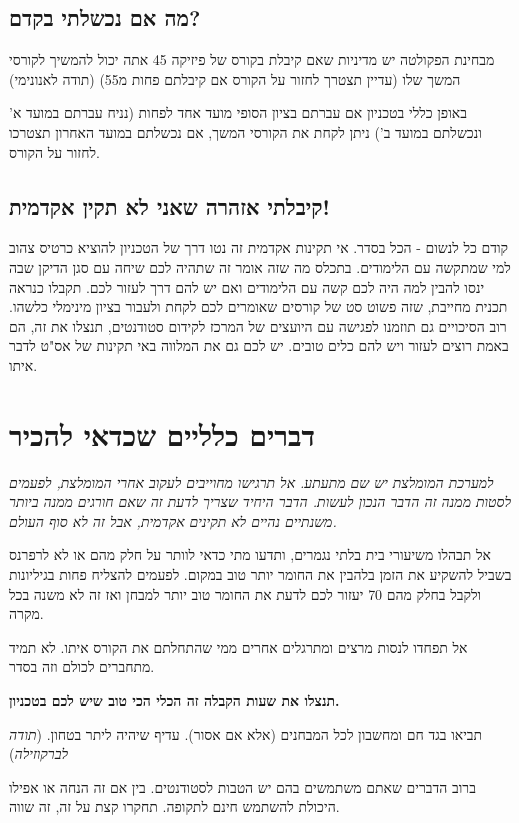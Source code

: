\documentclass[a4paper,12pt]{article}
\begin{document}
\subsection{מה אם נכשלתי בקדם?}

מבחינת הפקולטה יש מדיניות שאם קיבלת בקורס של פיזיקה 45 אתה יכול להמשיך לקורסי המשך שלו (עדיין תצטרך לחזור על הקורס אם קיבלתם פחות מ55) (תודה לאנונימי)

באופן כללי בטכניון אם עברתם בציון הסופי מועד אחד לפחות (נניח עברתם במועד א' ונכשלתם במועד ב') ניתן לקחת את הקורסי המשך, אם נכשלתם במועד האחרון תצטרכו לחזור על הקורס. 

\subsection{קיבלתי אזהרה שאני לא תקין אקדמית!}

קודם כל לנשום - הכל בסדר. אי תקינות אקדמית זה נטו דרך של הטכניון להוציא כרטיס צהוב למי שמתקשה עם הלימודים. בתכלס מה שזה אומר זה שתהיה לכם שיחה עם סגן הדיקן שבה ינסו להבין למה היה לכם קשה עם הלימודים ואם יש להם דרך לעזור לכם. תקבלו כנראה תכנית מחייבת, שזה פשוט סט של קורסים שאומרים לכם לקחת ולעבור בציון מינימלי כלשהו. רוב הסיכויים גם תוזמנו לפגישה עם היועצים של המרכז לקידום סטודנטים, תנצלו את זה, הם באמת רוצים לעזור ויש להם כלים טובים. יש לכם גם את המלווה באי תקינות של אס"ט לדבר איתו.

\section{דברים כלליים שכדאי להכיר}

\emph{למערכת המומלצת יש שם מתעתע. אל תרגישו מחוייבים לעקוב אחרי המומלצת, לפעמים לסטות ממנה זה הדבר הנכון לעשות. הדבר היחיד שצריך לדעת זה שאם חורגים ממנה ביותר משנתיים נהיים לא תקינים אקדמית, אבל זה לא סוף העולם.}

אל תבהלו משיעורי בית בלתי נגמרים, ותדעו מתי כדאי לוותר על חלק מהם או לא לרפרנס בשביל להשקיע את הזמן בלהבין את החומר יותר טוב במקום. לפעמים להצליח פחות בגיליונות ולקבל בחלק מהם 70 יעזור לכם לדעת את החומר טוב יותר למבחן ואז זה לא משנה בכל מקרה.

אל תפחדו לנסות מרצים ומתרגלים אחרים ממי שהתחלתם את הקורס איתו. לא תמיד מתחברים לכולם וזה בסדר.

\textbf{תנצלו את שעות הקבלה זה הכלי הכי טוב שיש לכם בטכניון.}

תביאו בגד חם ומחשבון לכל המבחנים (אלא אם אסור). עדיף שיהיה ליתר בטחון. (\emph{תודה לברקוזילה})

ברוב הדברים שאתם משתמשים בהם יש הטבות לסטודנטים. בין אם זה הנחה או אפילו היכולת להשתמש חינם לתקופה. תחקרו קצת על זה, זה שווה.
\end{document}
